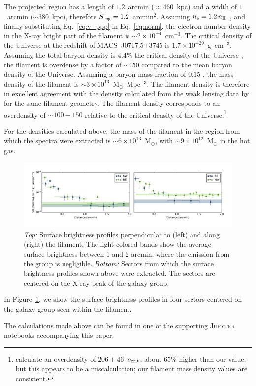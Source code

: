 The projected region has a length of $1.2$~arcmin ($\approx 460$~kpc) and a width of $1$~arcmin ($\sim 380$~kpc), therefore $S_{\rm reg} = 1.2$~arcmin$^{2}$. Assuming $n_{\rm e} = 1.2\, n_{\rm H}$ \citep[e.g.,][]{Bohringer2010}, and finally substituting Eq.~\ref{eq:v_ppp} in Eq.~\ref{eq:norm}, the electron number density in the X-ray bright part of the filament is $\sim 2\times 10^{-4}$~cm$^{-3}$. The critical density of the Universe at the redshift of MACS~J0717.5+3745 is $1.7\times 10^{-29}$~g~cm$^{-3}$. Assuming the total baryon density is $4.4\%$ the critical density of the Universe \citep{Kirkman2003}, the filament is overdense by a factor of $\sim 450$ compared to the mean baryon density of the Universe. Assuming a baryon mass fraction of $0.15$ \citep[e.g.,][]{Mantz2014}, the mass density of the filament is $\sim 3\times 10^{13}$~M$_{\odot}$~Mpc$^{-3}$. The filament density is therefore in excellent agreement with the density calculated from the weak lensing data by \citet{Jauzac2012} for the same filament geometry. The filament density corresponds to an overdensity of $\sim 100-150$ relative to the critical density of the Universe.\footnote{\citet{Jauzac2012} calculate an overdensity of $206\pm 46$~$\rho_{\rm crit}$, about $65\%$ higher than our value, but this appears to be a miscalculation; our filament mass density values are consistent.}

For the densities calculated above, the mass of the filament in the region from which the spectra were extracted is $\sim 6\times 10^{13}$~M$_\odot$, with $\sim 9\times 10^{12}$~M$_\odot$ in the hot gas. 

\begin{figure}
    \includegraphics[width=\textwidth]{plots/macsj0717-group-all-directions.pdf}
    \caption{\emph{Top:} Surface brightness profiles perpendicular to (left) and along (right) the filament. The light-colored bands show the average surface brightness between 1 and 2 arcmin, where the emission from the group is negligible. \emph{Bottom:} Sectors from which the surface brightness profiles shown above were extracted. The sectors are centered on the X-ray peak of the galaxy group. \label{fig:group-sx}}
\end{figure}

In Figure~\ref{fig:group-sx}, we show the surface brightness profiles in four sectors centered on the galaxy group seen within the filament.


The calculations made above can be found in one of the supporting \textsc{Jupyter} notebooks accompanying this paper.  





